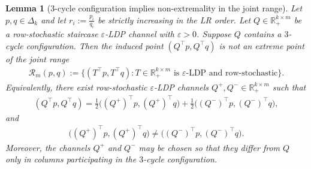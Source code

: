 \documentclass[10pt,a4paper]{amsart}
\newtheorem{lemma}{Lemma}
\begin{document}
\begin{lemma}[$3$-cycle configuration implies non-extremality in the joint range]
\label{lemma:3-cycle-implies-non-extremality-in-joint-range}
Let $p,q \in \Delta_k$ and let $r_i := \frac{p_i}{q_i}$ be strictly increasing in the LR order. Let $Q \in \mathbb{R}_+^{k\times m}$ be a row-stochastic staircase $\varepsilon$-LDP channel with $\varepsilon > 0$. Suppose $Q$ contains a $3$-cycle configuration. Then the induced point $(Q^\top p, Q^\top q)$ is not an extreme point of the joint range
\begin{align*}
    \mathcal{R}_m(p,q):=\{(T^\top p,T^\top q): T \in \mathbb{R}_+^{k\times m} \text{ is }\varepsilon\text{-LDP and row-stochastic}\}.
\end{align*}
Equivalently, there exist row-stochastic $\varepsilon$-LDP channels $Q^+,Q^-\in\mathbb{R}_+^{k\times m}$ such that
\begin{align*}
    (Q^\top p,Q^\top q)
    =
    \tfrac12\bigl((Q^+)^\top p,(Q^+)^\top q\bigr)
    +
    \tfrac12\bigl((Q^-)^\top p,(Q^-)^\top q\bigr),
\end{align*}
and
\begin{align*}
    \bigl((Q^+)^\top p,(Q^+)^\top q\bigr)\neq \bigl((Q^-)^\top p,(Q^-)^\top q\bigr).
\end{align*}
Moreover, the channels $Q^+$ and $Q^-$ may be chosen so that they differ from $Q$ only in columns participating in the $3$-cycle configuration.
\end{lemma}
\end{document}
